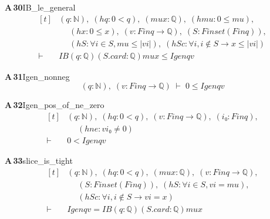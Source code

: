 \documentclass[conference]{IEEEtran}
\theoremstyle{definition}
\newcommand{\lean}[1]{\textsf{\footnotesize #1}}
\begin{document}
\noindent\textbf{A\,30}\quad\lean{IB\_le\_general}
{\footnotesize\[ \begin{aligned}[t]
&(\mathit{q} : \mathbb{N} ),\; (\mathit{hq} : 0 < \mathit{q}),\; (\mathit{mu} \mathit{x} : \mathbb{Q} ),\; (\mathit{hmu} : 0 \leq \mathit{mu}),\\
&\quad \; (\mathit{hx} : 0 \leq \mathit{x}),\; (\mathit{v} : \mathit{Fin} \mathit{q} \to \mathbb{Q} ),\; (\mathit{S} : \mathit{Finset} (\mathit{Fin} \mathit{q})),\\
&\quad \; (\mathit{hS} : \forall \mathit{i} \in \mathit{S}, \mathit{mu} \leq |\mathit{v} \mathit{i}|),\; (\mathit{hSc} : \forall \mathit{i}, \mathit{i} \notin \mathit{S} \to \mathit{x} \leq |\mathit{v} \mathit{i}|)\\
\vdash\;&\mathit{IB} (\mathit{q} : \mathbb{Q} ) (\mathit{S}.\mathit{card} : \mathbb{Q} ) \mathit{mu} \mathit{x} \leq \mathit{Igen} \mathit{q} \mathit{v}
\end{aligned} \]}

\noindent\textbf{A\,31}\quad\lean{Igen\_nonneg}
{\footnotesize\[ (\mathit{q} : \mathbb{N} ),\; (\mathit{v} : \mathit{Fin} \mathit{q} \to \mathbb{Q} ) \;\vdash\; 0 \leq \mathit{Igen} \mathit{q} \mathit{v} \]}

\noindent\textbf{A\,32}\quad\lean{Igen\_pos\_of\_ne\_zero}
{\footnotesize\[ \begin{aligned}[t]
&(\mathit{q} : \mathbb{N} ),\; (\mathit{hq} : 0 < \mathit{q}),\; (\mathit{v} : \mathit{Fin} \mathit{q} \to \mathbb{Q} ),\; (\mathit{i₀} : \mathit{Fin} \mathit{q}),\\
&\quad \; (\mathit{hne} : \mathit{v} \mathit{i₀} \neq 0)\\
\vdash\;&0 < \mathit{Igen} \mathit{q} \mathit{v}
\end{aligned} \]}

\noindent\textbf{A\,33}\quad\lean{slice\_is\_tight}
{\footnotesize\[ \begin{aligned}[t]
&(\mathit{q} : \mathbb{N} ),\; (\mathit{hq} : 0 < \mathit{q}),\; (\mathit{mu} \mathit{x} : \mathbb{Q} ),\; (\mathit{v} : \mathit{Fin} \mathit{q} \to \mathbb{Q} ),\\
&\quad \; (\mathit{S} : \mathit{Finset} (\mathit{Fin} \mathit{q})),\; (\mathit{hS} : \forall \mathit{i} \in \mathit{S}, \mathit{v} \mathit{i} = \mathit{mu}),\\
&\quad \; (\mathit{hSc} : \forall \mathit{i}, \mathit{i} \notin \mathit{S} \to \mathit{v} \mathit{i} = \mathit{x})\\
\vdash\;&\mathit{Igen} \mathit{q} \mathit{v} = \mathit{IB} (\mathit{q} : \mathbb{Q} ) (\mathit{S}.\mathit{card} : \mathbb{Q} ) \mathit{mu} \mathit{x}
\end{aligned} \]}
\end{document}
